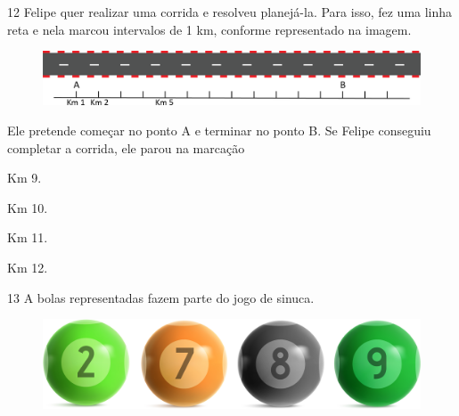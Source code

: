 

\num{12} Felipe quer realizar uma corrida e resolveu planejá-la. Para isso, fez
uma linha reta e nela marcou intervalos de 1 km, conforme representado na imagem.

\begin{figure}[htpb!]
\centering
\includegraphics[width=\textwidth]{./media/image6.png}
\end{figure}


Ele pretende começar no ponto A e terminar no ponto B. Se Felipe
conseguiu completar a corrida, ele parou na marcação

\begin{minipage}{.5\textwidth}
\begin{escolha}
\item Km 9.

\item Km 10.

\item Km 11.

\item Km 12.
\end{escolha}
\end{minipage}


\num{13} A bolas representadas fazem parte do jogo de sinuca.

\begin{figure}[htpb!]
\centering
\includegraphics[width=\textwidth]{./media/image7.png}
\end{figure}

